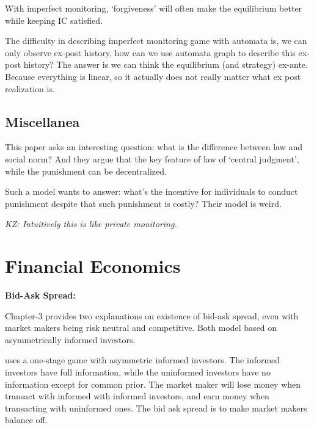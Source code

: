 \documentclass{book}
\theoremstyle{plain}
\theoremstyle{definition}
\begin{document}
With imperfect monitoring, `forgiveness' will often make the equilibrium better while keeping IC satisfied.

The difficulty in describing imperfect monitoring game with automata is, we can only observe ex-post history, 
how can we use automata graph to describe this ex-post history?
The answer is we can think the equilibrium (and strategy) ex-ante. 
Because everything is linear, so it actually does not really matter what ex post realization is.


\subsection{Miscellanea} %
\label{sub:miscellanea}

\textbf{}

This paper asks an interesting question: what is the difference between law and social norm?
And they argue that the key feature of law of `central judgment', while the punishment can be decentralized.

Such a model wants to answer: what's the incentive for individuals to conduct punishment despite that such punishment is costly?
Their model is weird.

\textit{KZ: Intuitively this is like private monitoring.}





\section{Financial Economics} %
\label{sec:financial_economics}

\noindent
\textbf{Bid-Ask Spread:}

\cite{oHara} Chapter-3 provides two explanations on existence of bid-ask spread, even with market makers being risk neutral and competitive.
Both model based on asymmetrically informed investors.

\vspace{1em}
\cite{copeland1983information} uses a one-stage game with asymmetric informed investors.
The informed investors have full information, 
while the uninformed investors have no information except for common prior.
The market maker will lose money when transact with informed with informed investors, and earn money when transacting with uninformed ones.
The bid ask spread is to make market makers balance off.
\end{document}
